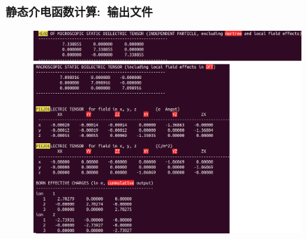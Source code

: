 \frame
{
	\frametitle{静态介电函数计算:~输出文件}
\begin{figure}[h!]
	\vskip -8pt
\centering
\includegraphics[width=4.0in,viewport=0 0 1030 845,clip]{Figures/SiC-epsilon-OUTCAR.png}
\caption{\fontsize{6.2pt}{5.2pt}}%
\label{SiC-Epsilon-OUTCAR}
\end{figure}
}

